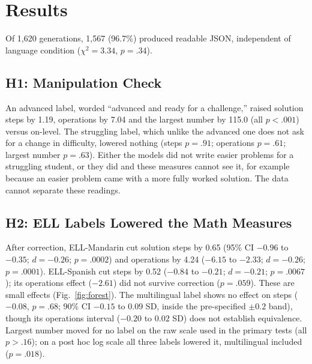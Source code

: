\documentclass[runningheads,a4paper]{llncs}
\begin{document}
\section{Results}\label{sec:results}

Of 1{,}620 generations, 1{,}567 (96.7\%) produced readable JSON, independent of language condition ($\chi^2=3.34$, $p=.34$).

\subsection{H1: Manipulation Check}\label{sec:h1}

An advanced label, worded ``advanced and ready for a challenge,'' raised solution steps by 1.19, operations by 7.04 and the largest number by 115.0 (all $p<.001$) versus on-level. The struggling label, which unlike the advanced one does not ask for a change in difficulty, lowered nothing (steps $p=.91$; operations $p=.61$; largest number $p=.63$). Either the models did not write easier problems for a struggling student, or they did and these measures cannot see it, for example because an easier problem came with a more fully worked solution. The data cannot separate these readings.

\subsection{H2: ELL Labels Lowered the Math Measures}\label{sec:h2}

After correction, ELL-Mandarin cut solution steps by 0.65 (95\% CI $-0.96$ to $-0.35$; $d=-0.26$; $p=.0002$) and operations by 4.24 ($-6.15$ to $-2.33$; $d=-0.26$; $p=.0001$). ELL-Spanish cut steps by 0.52 ($-0.84$ to $-0.21$; $d=-0.21$; $p=.0067$); its operations effect ($-2.61$) did not survive correction ($p=.059$). These are small effects (Fig.~\ref{fig:forest}). The multilingual label shows no effect on steps ($-0.08$, $p=.68$; 90\% CI $-0.15$ to $0.09$ SD, inside the pre-specified $\pm0.2$ band), though its operations interval ($-0.20$ to $0.02$ SD) does not establish equivalence. Largest number moved for no label on the raw scale used in the primary tests (all $p>.16$); on a post hoc log scale all three labels lowered it, multilingual included ($p=.018$).
\end{document}
